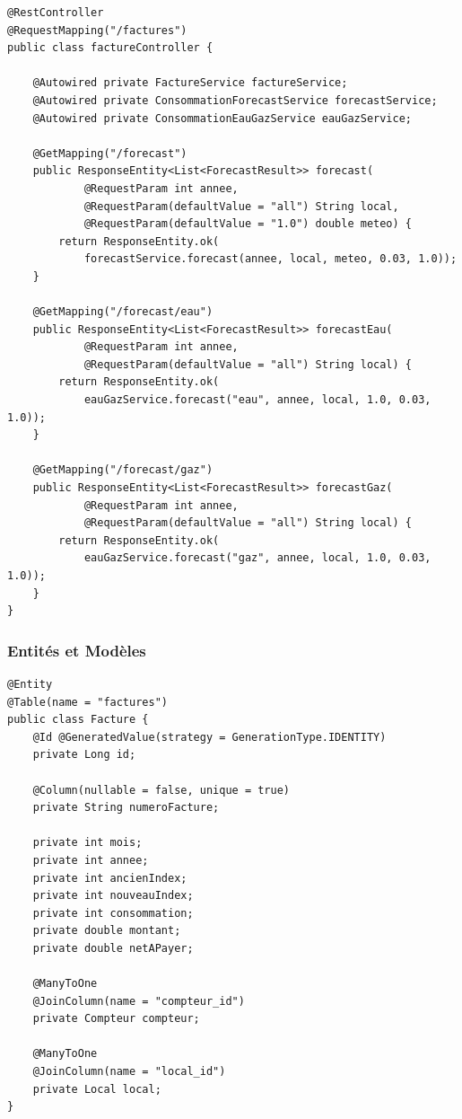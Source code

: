 \documentclass[12pt,a4paper]{article}
\begin{document}
\begin{lstlisting}[style=java, caption=Contrôleur des factures et estimations]
@RestController
@RequestMapping("/factures")
public class factureController {

    @Autowired private FactureService factureService;
    @Autowired private ConsommationForecastService forecastService;
    @Autowired private ConsommationEauGazService eauGazService;

    @GetMapping("/forecast")
    public ResponseEntity<List<ForecastResult>> forecast(
            @RequestParam int annee,
            @RequestParam(defaultValue = "all") String local,
            @RequestParam(defaultValue = "1.0") double meteo) {
        return ResponseEntity.ok(
            forecastService.forecast(annee, local, meteo, 0.03, 1.0));
    }

    @GetMapping("/forecast/eau")
    public ResponseEntity<List<ForecastResult>> forecastEau(
            @RequestParam int annee,
            @RequestParam(defaultValue = "all") String local) {
        return ResponseEntity.ok(
            eauGazService.forecast("eau", annee, local, 1.0, 0.03, 1.0));
    }

    @GetMapping("/forecast/gaz")
    public ResponseEntity<List<ForecastResult>> forecastGaz(
            @RequestParam int annee,
            @RequestParam(defaultValue = "all") String local) {
        return ResponseEntity.ok(
            eauGazService.forecast("gaz", annee, local, 1.0, 0.03, 1.0));
    }
}
\end{lstlisting}

\subsubsection{Entités et Modèles}
\begin{lstlisting}[style=java, caption=Entité Facture avec JPA]
@Entity
@Table(name = "factures")
public class Facture {
    @Id @GeneratedValue(strategy = GenerationType.IDENTITY)
    private Long id;

    @Column(nullable = false, unique = true)
    private String numeroFacture;

    private int mois;
    private int annee;
    private int ancienIndex;
    private int nouveauIndex;
    private int consommation;
    private double montant;
    private double netAPayer;

    @ManyToOne
    @JoinColumn(name = "compteur_id")
    private Compteur compteur;

    @ManyToOne
    @JoinColumn(name = "local_id")
    private Local local;
}
\end{lstlisting}
\end{document}
